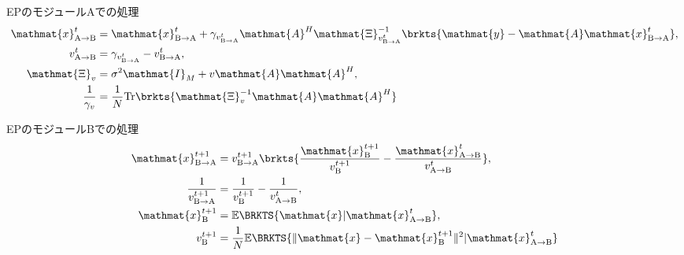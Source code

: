 \begin{frame}[t,noframenumbering]{EPのモジュールAでの処理}
\begin{align*}
\mathmat{x}_{\mathrm{A} \rightarrow \mathrm{B}}^t &= \mathmat{x}_{\mathrm{B} \rightarrow \mathrm{A}}^t + \gamma_{v^t_{\mathrm{B} \rightarrow \mathrm{A}}} \mathmat{A}^H \mathmat{\Xi}^{-1}_{v^t_{\mathrm{B} \rightarrow \mathrm{A}}} \brkts{ \mathmat{y} - \mathmat{A} \mathmat{x}^t_{\mathrm{B} \rightarrow \mathrm{A}} }, \\
v_{\mathrm{A} \rightarrow \mathrm{B}}^{t} &= \gamma_{v^t_{\mathrm{B} \rightarrow \mathrm{A}}} - v^t_{\mathrm{B} \rightarrow \mathrm{A}}, \\
\mathmat{\Xi}_{v} &= \sigma^2 \mathmat{I}_M + v \mathmat{A}\mathmat{A}^H,\\
\frac{1}{\gamma_v} &= \frac{1}{N} \mathrm{Tr}\brkts{ \mathmat{\Xi}_{v}^{-1} \mathmat{A} \mathmat{A}^H }
\end{align*}
\end{frame}


\begin{frame}[t,noframenumbering]{EPのモジュールBでの処理}
\begin{align*}
\mathmat{x}_{\mathrm{B} \rightarrow \mathrm{A}}^{t+1} &= v_{\mathrm{B} \rightarrow \mathrm{A}}^{t+1} \brkts{ \frac{\mathmat{x}_{\mathrm{B}}^{t+1}}{v_{\mathrm{B}}^{t+1}} - \frac{\mathmat{x}_{\mathrm{A} \rightarrow \mathrm{B}}^{t}}{v_{\mathrm{A} \rightarrow \mathrm{B}}^{t}}  }, \\
\frac{1}{v_{\mathrm{B} \rightarrow \mathrm{A}}^{t+1}} &= \frac{1}{v_{\mathrm{B}}^{t+1}} - \frac{1}{v_{\mathrm{A} \rightarrow \mathrm{B}}^{t}}, \\
\mathmat{x}_{\mathrm{B}}^{t+1} &= \mathbb{E}\BRKTS{\mathmat{x} | \mathmat{x}_{\mathrm{A} \rightarrow \mathrm{B}}^t },\\
v_\mathrm{B}^{t+1} &= \frac{1}{N} \mathbb{E}\BRKTS{ \| \mathmat{x} - \mathmat{x}_\mathrm{B}^{t+1} \|^2  | \mathmat{x}_{\mathrm{A} \rightarrow \mathrm{B}}^t }
\end{align*}
\end{frame}


